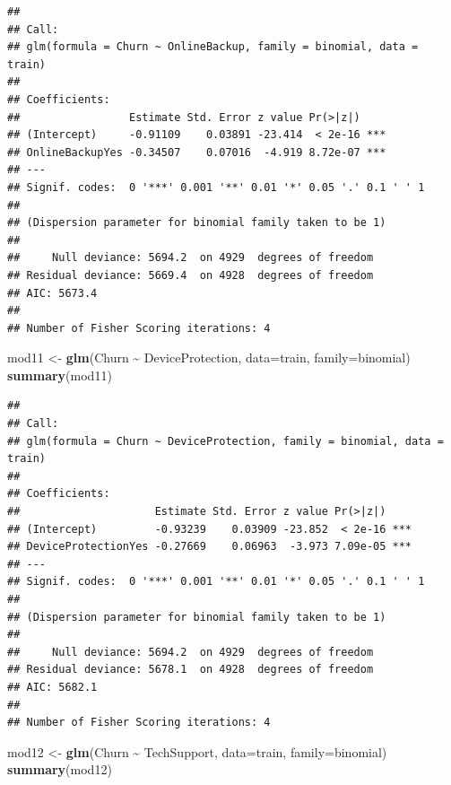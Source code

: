 \documentclass[
  twoside]{article}
\newenvironment{Shaded}{\begin{snugshade}}{\end{snugshade}}
\newcommand{\AttributeTok}[1]{\textcolor[rgb]{0.13,0.29,0.53}{#1}}
\newcommand{\FunctionTok}[1]{\textcolor[rgb]{0.13,0.29,0.53}{\textbf{#1}}}
\newcommand{\NormalTok}[1]{#1}
\newcommand{\OtherTok}[1]{\textcolor[rgb]{0.56,0.35,0.01}{#1}}
\newcommand{\SpecialCharTok}[1]{\textcolor[rgb]{0.81,0.36,0.00}{\textbf{#1}}}
\begin{document}
\begin{verbatim}
## 
## Call:
## glm(formula = Churn ~ OnlineBackup, family = binomial, data = train)
## 
## Coefficients:
##                 Estimate Std. Error z value Pr(>|z|)    
## (Intercept)     -0.91109    0.03891 -23.414  < 2e-16 ***
## OnlineBackupYes -0.34507    0.07016  -4.919 8.72e-07 ***
## ---
## Signif. codes:  0 '***' 0.001 '**' 0.01 '*' 0.05 '.' 0.1 ' ' 1
## 
## (Dispersion parameter for binomial family taken to be 1)
## 
##     Null deviance: 5694.2  on 4929  degrees of freedom
## Residual deviance: 5669.4  on 4928  degrees of freedom
## AIC: 5673.4
## 
## Number of Fisher Scoring iterations: 4
\end{verbatim}

\begin{Shaded}
\begin{Highlighting}[]
\NormalTok{mod11 }\OtherTok{\textless{}{-}} \FunctionTok{glm}\NormalTok{(Churn }\SpecialCharTok{\textasciitilde{}}\NormalTok{ DeviceProtection, }\AttributeTok{data=}\NormalTok{train, }\AttributeTok{family=}\NormalTok{binomial)}
\FunctionTok{summary}\NormalTok{(mod11)}
\end{Highlighting}
\end{Shaded}

\begin{verbatim}
## 
## Call:
## glm(formula = Churn ~ DeviceProtection, family = binomial, data = train)
## 
## Coefficients:
##                     Estimate Std. Error z value Pr(>|z|)    
## (Intercept)         -0.93239    0.03909 -23.852  < 2e-16 ***
## DeviceProtectionYes -0.27669    0.06963  -3.973 7.09e-05 ***
## ---
## Signif. codes:  0 '***' 0.001 '**' 0.01 '*' 0.05 '.' 0.1 ' ' 1
## 
## (Dispersion parameter for binomial family taken to be 1)
## 
##     Null deviance: 5694.2  on 4929  degrees of freedom
## Residual deviance: 5678.1  on 4928  degrees of freedom
## AIC: 5682.1
## 
## Number of Fisher Scoring iterations: 4
\end{verbatim}

\begin{Shaded}
\begin{Highlighting}[]
\NormalTok{mod12 }\OtherTok{\textless{}{-}} \FunctionTok{glm}\NormalTok{(Churn }\SpecialCharTok{\textasciitilde{}}\NormalTok{ TechSupport, }\AttributeTok{data=}\NormalTok{train, }\AttributeTok{family=}\NormalTok{binomial)}
\FunctionTok{summary}\NormalTok{(mod12)}
\end{Highlighting}
\end{Shaded}
\end{document}
